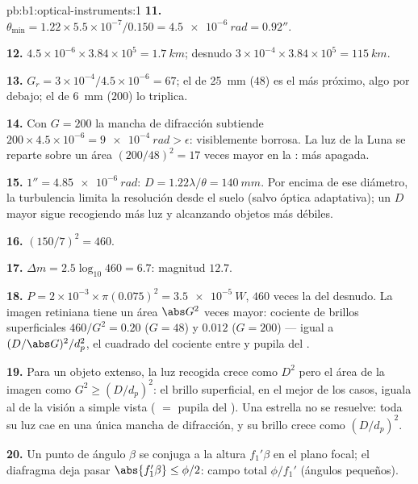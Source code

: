 \begin{solution}{pb:b1:optical-instruments:1}
\textbf{11.} $\theta_{\min} = 1.22 \times 5.5\times10^{-7}/0.150 =
\qty{4.5e-6}{rad} = 0.92''$.

\textbf{12.} $4.5\times10^{-6} \times 3.84\times10^5 = \qty{1.7}{km}$;
 desnudo $3\times10^{-4} \times 3.84\times10^5 = \qty{115}{km}$.

\textbf{13.} $G_r = 3\times10^{-4}/4.5\times10^{-6} = 67$; el  de \qty{25}{mm}
($48$) es el más próximo, algo por debajo; el de \qty{6}{mm} ($200$) lo
triplica.

\textbf{14.} Con $G = 200$ la mancha de difracción subtiende $200 \times 4.5
\times10^{-6} = \qty{9e-4}{rad} > \epsilon$: visiblemente borrosa. La luz
de la Luna se reparte sobre un área $(200/48)^2 = 17$ veces mayor en la
: más apagada.

\textbf{15.} $1'' = \qty{4.85e-6}{rad}$: $D = 1.22\lambda/\theta =
\qty{140}{mm}$. Por encima de ese diámetro, la turbulencia limita la
resolución desde el suelo (salvo óptica adaptativa); un $D$ mayor sigue
recogiendo más luz y alcanzando objetos más débiles.

\textbf{16.} $(150/7)^2 = 460$.

\textbf{17.} $\Delta m = 2.5\log_{10}460 = 6.7$: magnitud $12.7$.

\textbf{18.} $P = 2\times10^{-3} \times \pi(0.075)^2 = \qty{3.5e-5}{W}$,
$460$ veces la del  desnudo. La imagen retiniana tiene un área
$\abs G^2$ veces mayor: cociente de brillos superficiales $460/G^2 = 0.20$
($G = 48$) y $0.012$ ($G = 200$) --- igual a $(D/\abs G)^2/d_p^2$, el
cuadrado del cociente entre  y pupila del .

\textbf{19.} Para un objeto extenso, la luz recogida crece como $D^2$ pero
el área de la imagen como $G^2 \geq (D/d_p)^2$: el brillo superficial, en
el mejor de los casos, iguala al de la visión a simple vista ( $=$ pupila del ). Una estrella no se resuelve: toda su luz cae
en una única mancha de difracción, y su brillo crece como $(D/d_p)^2$.

\textbf{20.} Un punto de ángulo $\beta$ se conjuga a la altura $f_1'\beta$
en el plano focal; el diafragma deja pasar $\abs{f_1'\beta} \leq \phi/2$:
campo total $\phi/f_1'$ (ángulos pequeños).


\end{solution}

